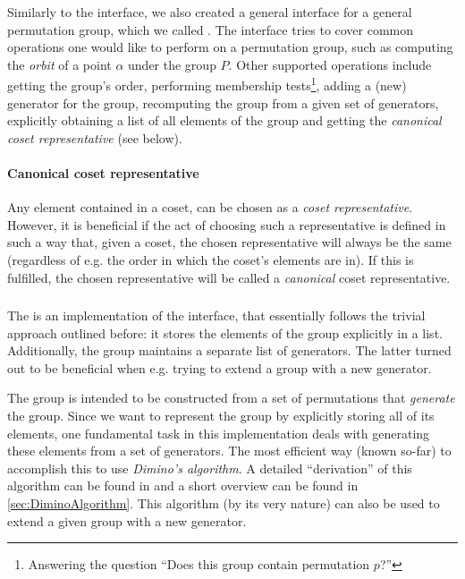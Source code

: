 \documentclass[parskip=half]{scrartcl}
\begin{document}
	\subsubsection{\texorpdfstring{}{AbstractPermutationGroup}}

	Similarly to the  interface, we also created a general interface for a general permutation group, which we called
	. The interface tries to cover common operations one would like to perform on a permutation group, such as
	computing the \emph{orbit} of a point $\alpha$ under the group $P$. Other supported operations include getting the group's order, performing
	membership tests\footnote{Answering the question \enquote{Does this group contain permutation $p$?}}, adding a (new) generator for the group,
	recomputing the group from a given set of generators, explicitly obtaining a list of all elements of the group and getting the \emph{canonical
	coset representative} (see below).

	\paragraph{Canonical coset representative} Any element contained in a coset, can be chosen as a \emph{coset representative}. However, it is
	beneficial if the act of choosing such a representative is defined in such a way that, given a coset, the chosen representative will always be
	the same (regardless of e.g. the order in which the coset's elements are in). If this is fulfilled, the chosen representative will be called a
	\emph{canonical} coset representative.


	\subsubsection{\texorpdfstring{}{PrimitivePermutationGroup}}

	The  is an implementation of the  interface, that essentially follows the trivial
	approach outlined before: it stores the elements of the group explicitly in a list. Additionally, the group maintains a separate list of
	generators. The latter turned out to be beneficial when e.g. trying to extend a group with a new generator.

	The group is intended to be constructed from a set of permutations that \emph{generate} the group. Since we want to represent the group by
	explicitly storing all of its elements, one fundamental task in this implementation deals with generating these elements from a set of generators.
	The most efficient way (known so-far) to accomplish this to use \emph{Dimino's algorithm}.\supercite{Butler1991a} A detailed \enquote{derivation}
	of this algorithm can be found in \textcite{Butler1991a} and a short overview can be found in \cref{sec:DiminoAlgorithm}. This algorithm (by its
	very nature) can also be used to extend a given group with a new generator.
\end{document}
